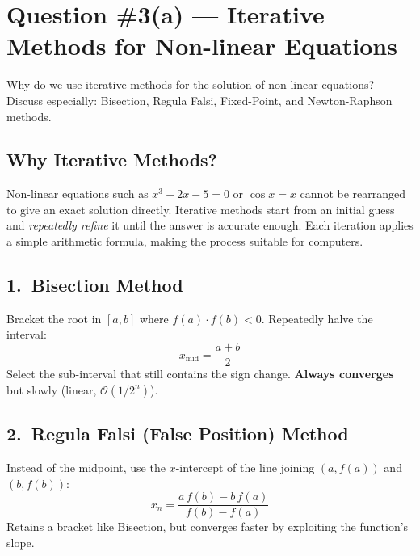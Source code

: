 \documentclass[12pt]{article}
\begin{document}
\newpage

\section{Question \#3(a) --- Iterative Methods for Non-linear Equations}

\begin{problembox}
Why do we use iterative methods for the solution of non-linear equations?
Discuss especially: Bisection, Regula Falsi, Fixed-Point, and Newton-Raphson methods.
\end{problembox}

\subsection*{Why Iterative Methods?}

\begin{conceptbox}
Non-linear equations such as $x^3 - 2x - 5 = 0$ or $\cos x = x$ cannot be rearranged to give an exact solution directly.
Iterative methods start from an initial guess and \emph{repeatedly refine} it until the answer is accurate enough.
Each iteration applies a simple arithmetic formula, making the process suitable for computers.
\end{conceptbox}

\vspace{8pt}
\subsection*{1.\ Bisection Method}

Bracket the root in $[a,b]$ where $f(a)\cdot f(b)<0$.  Repeatedly halve the interval:
\[
  x_{\text{mid}} = \frac{a+b}{2}
\]
Select the sub-interval that still contains the sign change. \textbf{Always converges} but slowly (linear, $\mathcal{O}(1/2^n)$).

\vspace{6pt}
\subsection*{2.\ Regula Falsi (False Position) Method}

Instead of the midpoint, use the $x$-intercept of the line joining $(a,f(a))$ and $(b,f(b))$:
\[
  x_n = \frac{a\,f(b) - b\,f(a)}{f(b) - f(a)}
\]
Retains a bracket like Bisection, but converges faster by exploiting the function's slope.
\end{document}
